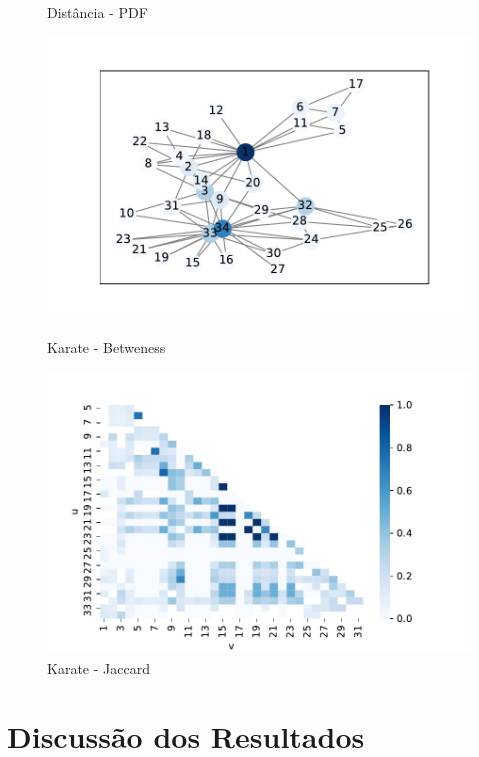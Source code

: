 \documentclass[12pt,a4paper]{article}
\begin{document}
\begin{figure}[hbt]
\begin{minipage}{.5\textwidth}
			\caption{Distância - PDF}
			\label{fig:distance}
		\end{minipage}
	\end{figure}

	\begin{figure}[hbt]
		\centering
		\begin{minipage}{.5\textwidth}
			\centering
			\includegraphics[width=1\linewidth]{karate-betweeness}
			\caption{Karate - Betweness}
			\label{fig:betweeness}
		\end{minipage}%
		\begin{minipage}{.5\textwidth}
			\centering
			\includegraphics[width=1\linewidth]{karate-jaccard}
			\caption{Karate - Jaccard}
			\label{fig:jaccard}
		\end{minipage}
	\end{figure}
	
	\section{Discussão dos Resultados}
	
\end{document}
